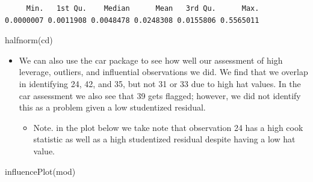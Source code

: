 \documentclass[
  letterpaper,
  DIV=11,
  numbers=noendperiod]{scrartcl}
\newenvironment{Shaded}{\begin{snugshade}}{\end{snugshade}}
\newcommand{\FunctionTok}[1]{\textcolor[rgb]{0.28,0.35,0.67}{#1}}
\newcommand{\NormalTok}[1]{\textcolor[rgb]{0.00,0.23,0.31}{#1}}
\providecommand{\tightlist}{%
  \setlength{\itemsep}{0pt}\setlength{\parskip}{0pt}}\usepackage{longtable,booktabs,array}
\begin{document}
\begin{verbatim}
     Min.   1st Qu.    Median      Mean   3rd Qu.      Max. 
0.0000007 0.0011908 0.0048478 0.0248308 0.0155806 0.5565011 
\end{verbatim}

\begin{Shaded}
\begin{Highlighting}[]
\FunctionTok{halfnorm}\NormalTok{(cd)}
\end{Highlighting}
\end{Shaded}


\begin{itemize}
\tightlist
\item
  We can also use the car package to see how well our assessment of high
  leverage, outliers, and influential observations we did. We find that
  we overlap in identifying 24, 42, and 35, but not 31 or 33 due to high
  hat values. In the car assessment we also see that 39 gets flagged;
  however, we did not identify this as a problem given a low studentized
  residual.

  \begin{itemize}
  \tightlist
  \item
    Note. in the plot below we take note that observation 24 has a high
    cook statistic as well as a high studentized residual despite having
    a low hat value.
  \end{itemize}
\end{itemize}

\begin{Shaded}
\begin{Highlighting}[]
\FunctionTok{influencePlot}\NormalTok{(mod)}
\end{Highlighting}
\end{Shaded}
\end{document}
